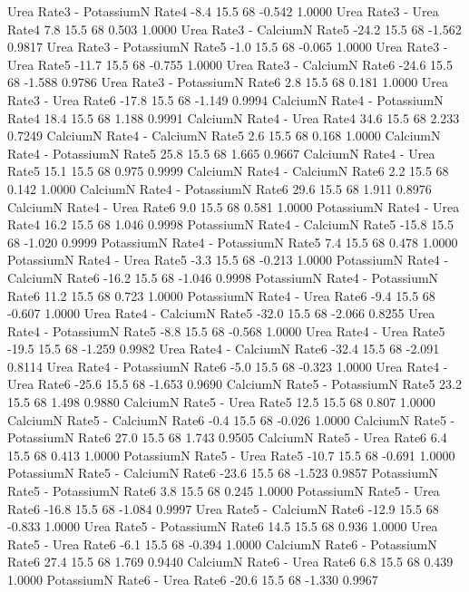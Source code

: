 \documentclass[a4paper,12pt]{article}
\begin{document}
\begin{enumerate}[label=\textbf{\alph*})]
\begin{MyVerbatim}
Urea       Rate3 - PotassiumN Rate4       -8.4 15.5 68  -0.542  1.0000
Urea       Rate3 - Urea Rate4              7.8 15.5 68   0.503  1.0000
Urea       Rate3 - CalciumN Rate5        -24.2 15.5 68  -1.562  0.9817
Urea       Rate3 - PotassiumN Rate5       -1.0 15.5 68  -0.065  1.0000
Urea       Rate3 - Urea Rate5            -11.7 15.5 68  -0.755  1.0000
Urea       Rate3 - CalciumN Rate6        -24.6 15.5 68  -1.588  0.9786
Urea       Rate3 - PotassiumN Rate6        2.8 15.5 68   0.181  1.0000
Urea       Rate3 - Urea Rate6            -17.8 15.5 68  -1.149  0.9994
CalciumN   Rate4 - PotassiumN Rate4       18.4 15.5 68   1.188  0.9991
CalciumN   Rate4 - Urea Rate4             34.6 15.5 68   2.233  0.7249
CalciumN   Rate4 - CalciumN Rate5          2.6 15.5 68   0.168  1.0000
CalciumN   Rate4 - PotassiumN Rate5       25.8 15.5 68   1.665  0.9667
CalciumN   Rate4 - Urea Rate5             15.1 15.5 68   0.975  0.9999
CalciumN   Rate4 - CalciumN Rate6          2.2 15.5 68   0.142  1.0000
CalciumN   Rate4 - PotassiumN Rate6       29.6 15.5 68   1.911  0.8976
CalciumN   Rate4 - Urea Rate6              9.0 15.5 68   0.581  1.0000
PotassiumN Rate4 - Urea Rate4             16.2 15.5 68   1.046  0.9998
PotassiumN Rate4 - CalciumN Rate5        -15.8 15.5 68  -1.020  0.9999
PotassiumN Rate4 - PotassiumN Rate5        7.4 15.5 68   0.478  1.0000
PotassiumN Rate4 - Urea Rate5             -3.3 15.5 68  -0.213  1.0000
PotassiumN Rate4 - CalciumN Rate6        -16.2 15.5 68  -1.046  0.9998
PotassiumN Rate4 - PotassiumN Rate6       11.2 15.5 68   0.723  1.0000
PotassiumN Rate4 - Urea Rate6             -9.4 15.5 68  -0.607  1.0000
Urea       Rate4 - CalciumN Rate5        -32.0 15.5 68  -2.066  0.8255
Urea       Rate4 - PotassiumN Rate5       -8.8 15.5 68  -0.568  1.0000
Urea       Rate4 - Urea Rate5            -19.5 15.5 68  -1.259  0.9982
Urea       Rate4 - CalciumN Rate6        -32.4 15.5 68  -2.091  0.8114
Urea       Rate4 - PotassiumN Rate6       -5.0 15.5 68  -0.323  1.0000
Urea       Rate4 - Urea Rate6            -25.6 15.5 68  -1.653  0.9690
CalciumN   Rate5 - PotassiumN Rate5       23.2 15.5 68   1.498  0.9880
CalciumN   Rate5 - Urea Rate5             12.5 15.5 68   0.807  1.0000
CalciumN   Rate5 - CalciumN Rate6         -0.4 15.5 68  -0.026  1.0000
CalciumN   Rate5 - PotassiumN Rate6       27.0 15.5 68   1.743  0.9505
CalciumN   Rate5 - Urea Rate6              6.4 15.5 68   0.413  1.0000
PotassiumN Rate5 - Urea Rate5            -10.7 15.5 68  -0.691  1.0000
PotassiumN Rate5 - CalciumN Rate6        -23.6 15.5 68  -1.523  0.9857
PotassiumN Rate5 - PotassiumN Rate6        3.8 15.5 68   0.245  1.0000
PotassiumN Rate5 - Urea Rate6            -16.8 15.5 68  -1.084  0.9997
Urea       Rate5 - CalciumN Rate6        -12.9 15.5 68  -0.833  1.0000
Urea       Rate5 - PotassiumN Rate6       14.5 15.5 68   0.936  1.0000
Urea       Rate5 - Urea Rate6             -6.1 15.5 68  -0.394  1.0000
CalciumN   Rate6 - PotassiumN Rate6       27.4 15.5 68   1.769  0.9440
CalciumN   Rate6 - Urea Rate6              6.8 15.5 68   0.439  1.0000
PotassiumN Rate6 - Urea Rate6            -20.6 15.5 68  -1.330  0.9967


\end{MyVerbatim}
\end{enumerate}
\end{document}
